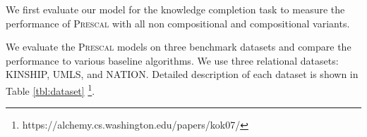 
We first evaluate our model for the knowledge completion task
to measure the performance of \textsc{Prescal} with all non compositional and compositional variants.

We evaluate the \textsc{Prescal} models on three benchmark datasets and compare the performance to various baseline
algorithms. We use three relational datasets: KINSHIP, UMLS, and NATION. Detailed description of each
dataset is shown in Table \ref{tbl:dataset} \footnote{https://alchemy.cs.washington.edu/papers/kok07/}.


